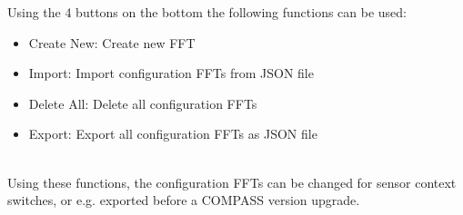 Using the 4 buttons on the bottom the following functions can be used:

\begin{itemize}
\item Create New: Create new FFT
\item Import: Import configuration FFTs from JSON file
\item Delete All: Delete all configuration FFTs
\item Export: Export all configuration FFTs as JSON file
\end{itemize}
\ \\

Using these functions, the configuration FFTs can be changed for sensor context switches, or e.g. exported before a COMPASS version upgrade.
